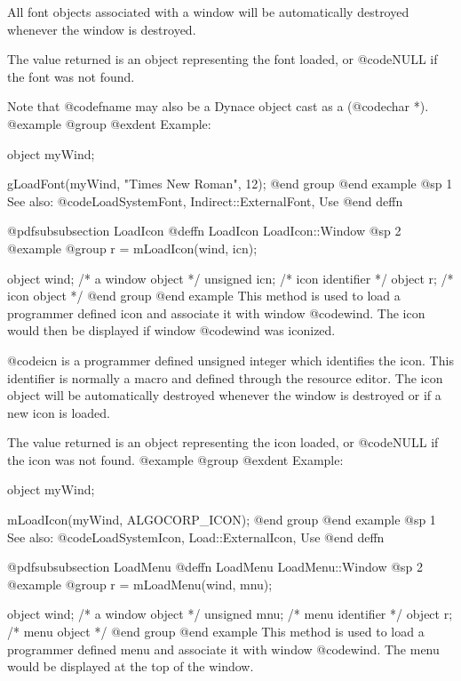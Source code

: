 All font objects associated with a window will be automatically
destroyed whenever the window is destroyed.

The value returned is an object representing the font loaded, or
@code{NULL} if the font was not found.

Note that @code{fname} may also be a Dynace object cast as a (@code{char *}).
@example
@group
@exdent Example:

object  myWind;

gLoadFont(myWind, "Times New Roman", 12);
@end group
@end example
@sp 1
See also:  @code{LoadSystemFont, Indirect::ExternalFont, Use}
@end deffn









@pdfsubsubsection {LoadIcon}
@deffn {LoadIcon} LoadIcon::Window
@sp 2
@example
@group
r = mLoadIcon(wind, icn);

object   wind;  /*  a window object  */
unsigned icn;   /*  icon identifier  */
object   r;     /*  icon object      */
@end group
@end example
This method is used to load a programmer defined icon and associate it
with window @code{wind}.  The icon would then be displayed if window
@code{wind} was iconized.

@code{icn} is a programmer defined unsigned integer which identifies
the icon.  This identifier is normally a macro and defined through the
resource editor.  The icon object will be automatically destroyed
whenever the window is destroyed or if a new icon is loaded.

The value returned is an object representing the icon loaded, or
@code{NULL} if the icon was not found.
@example
@group
@exdent Example:

object  myWind;

mLoadIcon(myWind, ALGOCORP_ICON);
@end group
@end example
@sp 1
See also:  @code{LoadSystemIcon, Load::ExternalIcon, Use}
@end deffn








@pdfsubsubsection {LoadMenu}
@deffn {LoadMenu} LoadMenu::Window
@sp 2
@example
@group
r = mLoadMenu(wind, mnu);

object   wind;  /*  a window object  */
unsigned mnu;   /*  menu identifier  */
object   r;     /*  menu object      */
@end group
@end example
This method is used to load a programmer defined menu and associate it
with window @code{wind}.  The menu would be displayed at the top
of the window.

